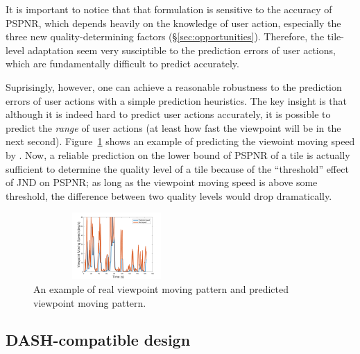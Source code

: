 It is important to notice that that formulation is sensitive to the accuracy of PSPNR, which depends heavily on the knowledge of user action, especially the three new quality-determining factors (\S\ref{sec:opportunities}).
Therefore, the tile-level adaptation seem very susciptible to the prediction errors of user actions, which are fundamentally difficult to predict accurately.

Suprisingly, however, one can achieve a reasonable robustness to the prediction errors of user actions with a simple prediction heuristics. 
The key insight is that although it is indeed hard to predict user actions accurately, it is possible to predict the {\em range} of user actions (\eg at least how fast the viewpoint will be in the next second). 
Figure~\ref{speed_analysis} shows an example of predicting the viewoint moving speed by \fillme.  
Now, a reliable prediction on the lower bound of PSPNR of a tile is actually sufficient to determine the quality level of a tile because of the ``threshold'' effect of JND on PSPNR; \eg as long as the viewpoint moving speed is above some threshold, the difference between two quality levels would drop dramatically.

\begin{figure}
  \centering
  \includegraphics[width=2.5in, height=1in]{images/speed_analysis.pdf}
  \caption{An example of real viewpoint moving pattern and predicted viewpoint moving pattern.}
  \label{speed_analysis}
  \end{figure}


\subsection{DASH-compatible design}
\label{subsec:compatible}